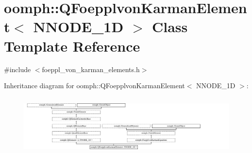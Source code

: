 \hypertarget{classoomph_1_1QFoepplvonKarmanElement}{}\section{oomph\+:\+:Q\+Foepplvon\+Karman\+Element$<$ N\+N\+O\+D\+E\+\_\+1D $>$ Class Template Reference}
\label{classoomph_1_1QFoepplvonKarmanElement}


{\ttfamily \#include $<$foeppl\+\_\+von\+\_\+karman\+\_\+elements.\+h$>$}

Inheritance diagram for oomph\+:\+:Q\+Foepplvon\+Karman\+Element$<$ N\+N\+O\+D\+E\+\_\+1D $>$\+:\begin{figure}[H]
\begin{center}
\leavevmode
\includegraphics[height=3.141026cm]{classoomph_1_1QFoepplvonKarmanElement}
\end{center}
\end{figure}
